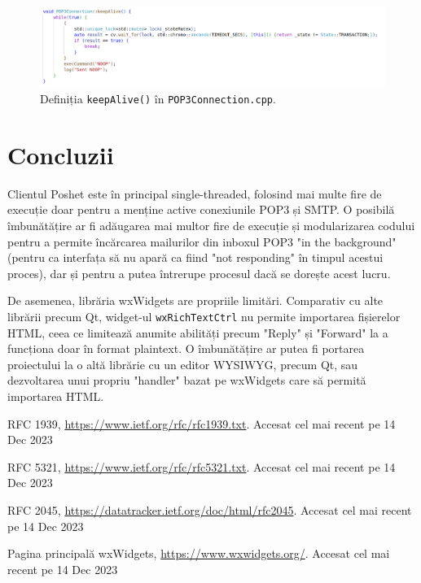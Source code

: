 \documentclass[runningheads]{llncs}
\begin{document}
\begin{figure}
    \centering
    \includegraphics[width=\textwidth]{keepAlive.png}
    \caption{Definiția \texttt{keepAlive()} în \texttt{POP3Connection.cpp}.}
    \label{fig:keepalive}
\end{figure}

\section{Concluzii}

Clientul Poshet este în principal single-threaded, folosind mai multe fire de execuție doar pentru a menține active conexiunile POP3 și SMTP. O posibilă îmbunătățire ar fi adăugarea mai multor fire de execuție și modularizarea codului pentru a permite încărcarea mailurilor din inboxul POP3 "in the background" (pentru ca interfața să nu apară ca fiind "not responding" în timpul acestui proces), dar și pentru a putea întrerupe procesul dacă se dorește acest lucru.

De asemenea, librăria wxWidgets are propriile limitări. Comparativ cu alte librării precum Qt, widget-ul \texttt{wxRichTextCtrl} nu permite importarea fișierelor HTML, ceea ce limitează anumite abilități precum "Reply" și "Forward" la a funcționa doar în format plaintext. O îmbunătățire ar putea fi portarea proiectului la o altă librărie cu un editor WYSIWYG, precum Qt, sau dezvoltarea unui propriu "handler" bazat pe wxWidgets care să permită importarea HTML.
%
%
%
% 
% 

\renewcommand\refname{Referințe bibliografice}
\begin{thebibliography}{8}
RFC 1939, \url{https://www.ietf.org/rfc/rfc1939.txt}. Accesat cel mai recent pe 14 Dec 2023

RFC 5321, \url{https://www.ietf.org/rfc/rfc5321.txt}. Accesat cel mai recent pe 14 Dec 2023

RFC 2045, \url{https://datatracker.ietf.org/doc/html/rfc2045}. Accesat cel mai recent pe 14 Dec 2023

Pagina principală wxWidgets, \url{https://www.wxwidgets.org/}. Accesat cel mai recent pe 14 Dec 2023


\end{thebibliography}
\end{document}
